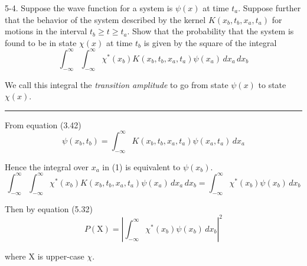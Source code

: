 \documentclass[12pt]{article}
\begin{document}
5-4.
Suppose the wave function for a system is $\psi(x)$ at time $t_a$.
Suppose further that the behavior of the system described by
the kernel $K(x_b,t_b,x_a,t_a)$ for motions in the interval
$t_b\ge t\ge t_a$.
Show that the probability that the system is found to be in state
$\chi(x)$ at time $t_b$ is given by the square of the integral
\begin{equation*}
\int_{-\infty}^\infty\int_{-\infty}^\infty
\chi^*(x_b)
K(x_b,t_b,x_a,t_a)
\psi(x_a)
\,dx_a\,dx_b
\tag{1}
\end{equation*}

We call this integral the {\it transition amplitude} to go from
state $\psi(x)$ to state $\chi(x)$.

\bigskip
\hrule

\bigskip
From equation (3.42)
\begin{equation*}
\psi(x_b,t_b)=\int_{-\infty}^\infty
K(x_b,t_b,x_a,t_a)
\psi(x_a,t_a)
\,dx_a
\end{equation*}

Hence the integral over $x_a$ in (1) is equivalent to $\psi(x_b)$.
\begin{equation*}
\int_{-\infty}^\infty\int_{-\infty}^\infty
\chi^*(x_b)
K(x_b,t_b,x_a,t_a)
\psi(x_a)
\,dx_a\,dx_b
=\int_{-\infty}^\infty
\chi^*(x_b)
\psi(x_b)
\,dx_b
\end{equation*}

Then by equation (5.32)
\begin{equation*}
P(\mathrm X)=\left|
\int_{-\infty}^\infty
\chi^*(x_b)
\psi(x_b)
\,dx_b
\right|^2
\end{equation*}

where $\mathrm X$ is upper-case $\chi$.
\end{document}
